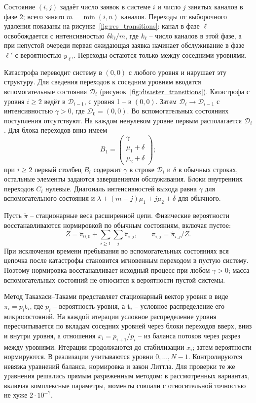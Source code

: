 \documentclass[a4paper,12pt]{article}
\begin{document}
Состояние \((i,j)\) задаёт число заявок в системе \(i\) и число \(j\) занятых каналов в фазе 2; всего занято \(m=\min(i,n)\) каналов. Переходы от выборочного удаления показаны на рисунке~\ref{fig:rcs_transitions}: канал в фазе \(\ell\) освобождается с интенсивностью \(\delta k_\ell/m\), где \(k_\ell\) -- число каналов в этой фазе, а при непустой очереди первая ожидающая заявка начинает обслуживание в фазе \(\ell'\) с вероятностью \(y_{\ell'}\). Переходы остаются только между соседними уровнями.

Катастрофа переводит систему в \((0,0)\) с любого уровня и нарушает эту структуру. Для сведения переходов к соседним уровням вводятся вспомогательные состояния \(\mathcal D_i\) (рисунок~\ref{fig:disaster_transitions}). Катастрофа с уровня \(i\ge2\) ведёт в \(\mathcal D_{i-1}\), с уровня 1 -- в \((0,0)\). Затем \(\mathcal D_i\to\mathcal D_{i-1}\) с интенсивностью \(\gamma>0\), где \(\mathcal D_0=(0,0)\). Во вспомогательных состояниях поступления отсутствуют. На каждом ненулевом уровне первым располагается \(\mathcal D_i\). Для блока переходов вниз имеем
\[
B_1=\begin{pmatrix}\gamma\\\mu_1+\delta\\\mu_2+\delta\end{pmatrix};
\]
при \(i\ge2\) первый столбец \(B_i\) содержит \(\gamma\) в строке \(\mathcal D_i\) и \(\delta\) в обычных строках, остальные элементы задаются завершениями обслуживания. Блоки внутренних переходов \(C_i\) нулевые. Диагональ интенсивностей выхода равна \(\gamma\) для вспомогательного состояния и \(\lambda+(m-j)\mu_1+j\mu_2+\delta\) для обычного.

Пусть \(\widetilde\pi\) -- стационарные веса расширенной цепи. Физические вероятности восстанавливаются нормировкой по обычным состояниям, включая пустое:
\[
Z=\widetilde\pi_{0,0}+\sum_{i\ge1}\sum_j\widetilde\pi_{i,j},\qquad
\pi_{i,j}=\widetilde\pi_{i,j}/Z.
\]
При исключении времени пребывания во вспомогательных состояниях вся цепочка после катастрофы становится мгновенным переходом в пустую систему. Поэтому нормировка восстанавливает исходный процесс при любом \(\gamma>0\); масса вспомогательных состояний не относится к вероятности пустой системы.

Метод Такахаси--Таками представляет стационарный вектор уровня в виде \(\pi_i=p_i\boldsymbol t_i\), где \(p_i\) -- вероятность уровня, а \(\boldsymbol t_i\) -- условное распределение его микросостояний. На каждой итерации условное распределение уровня пересчитывается по вкладам соседних уровней через блоки переходов вверх, вниз и внутри уровня, а отношения \(x_i=p_{i+1}/p_i\) -- из баланса потоков через разрез между уровнями. Итерации продолжаются до стабилизации \(x_i\); затем вероятности нормируются. В реализации учитываются уровни \(0,\ldots,N-1\). Контролируются невязка уравнений баланса, нормировка и закон Литтла. Для проверки те же уравнения решались прямым разреженным методом: в рассмотренных вариантах, включая комплексные параметры, моменты совпали с относительной точностью не хуже \(2\cdot10^{-7}\).
\end{document}
